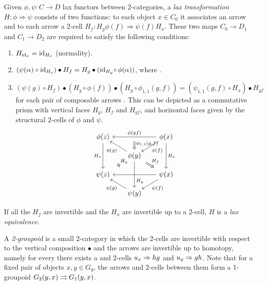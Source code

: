 Given $\phi,\psi\colon C\to D$ lax functors between 2-categories, a \emph{lax transformation} $H\colon\phi\Rightarrow\psi$ consists of two functions: to each object $x\in C_0$ it associates an arrow  and to each arrow  a 2-cell $H_f\colon H_y\phi(f)\Rightarrow\psi(f)H_x$.
These two maps $C_0\to D_1$ and $C_1\to D_2$ are required to satisfy the following conditions:
\begin{enumerate}[label=\roman*)]
  \item $H_{\operatorname{id}_x} = \operatorname{id}_{H_x}$ (normality).
  \item $(\psi(\alpha)\circ \operatorname{id}_{H_x})\bullet H_f = H_g \bullet(\operatorname{id}_{H_y}\!\circ\,\phi(\alpha))$,
  where .
  \item $(\psi(g)\circ H_f)\bullet(H_g\circ\phi(f))\bullet(H_g\circ\phi_{1,1}(g,f)) = (\psi_{1,1}(g,f)\circ H_x)\bullet H_{gf}$ for each pair of composable arrows .
  This can be depicted as a commutative prism with vertical faces $H_g$, $H_f$ and $H_{gf}$, and horizontal faces given by the structural 2-cells of $\phi$ and $\psi$.
  \begin{equation}
    \begin{tikzcd}[row sep=10pt, column sep=17pt]
      \phi(z) \ar{dd}[swap]{H_z} \ar[Rightarrow, shorten = 33.7pt]{dddr}{H_g} & \ar[Rightarrow, near start]{d}{\phi_{1,1}(g,f)} & \phi(x) \ar{ll}[swap]{\phi(gf)} \ar{dd}{H_x} \ar[shorten = -4pt]{ld}{\phi(f)} \\
       & \phi(y) \ar[near end]{dd}{H_y} \ar[shorten = -4pt]{lu}{\phi(g)} \ar[Rightarrow, shorten = 3.2pt]{dr}{H_f} & \\
      \psi(z) & & \psi(x) \ar{ll} \ar[shorten = -4pt]{ld}{\psi(f)} \\
       & \psi(y) \ar[shorten = -4pt]{lu}{\psi(g)} &
    \end{tikzcd}
  \end{equation}
\end{enumerate}
If all the $H_f$ are invertible and the $H_x$ are invertible up to a 2-cell, $H$ is a \emph{lax equivalence}.

A \emph{2-groupoid} is a small 2-category in which the 2-cells are invertible with respect to the vertical composition $\bullet$ and the arrows are invertible up to homotopy, namely for every  there exists a  and 2-cells $u_x\Rightarrow hg$ and $u_y\Rightarrow gh$.
Note that for a fixed pair of objects $x,y\in G_0$, the arrows and 2-cells between them form a 1-groupoid $G_2(y,x)\rightrightarrows G_1(y,x)$.

